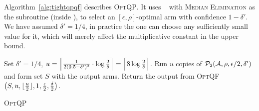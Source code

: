 Algorithm~\ref{alg:tightqpqf} describes \textsc{OptQP}. It uses \PP~\cite{bib:arcsk2017} with  \textsc{ Median Elimination}  as the 
subroutine (inside \PP), to select an  $[\epsilon, \rho]$-optimal arm with confidence $1-\delta'$.
We have assumed $\delta' = 1/4$, in practice the one can choose any
sufficiently small value for it, which will merely affect the multiplicative constant in the upper bound.
\begin{algorithm}[]
\begin{algorithmic}
 \STATE Set $\delta' = 1/4$, $u = \Big\lceil\frac{1}{2(0.5-\delta')^2} \cdot \log\frac{2}{\delta}\Big\rceil = \Big\lceil8 \log\frac{2}{\delta}\Big\rceil$.\;
 \STATE Run $u$ copies of $\mathcal{P}_2(\mathcal{A}, \rho, \epsilon/2, \delta')$ and form set $S$ with the output arms.\;
 \STATE Return the output from \textsc{OptQF} $\left(S, u, \lfloor\frac{u}{2}\rfloor, 1, \frac{\epsilon}{2}, \frac{\delta}{2}\right)$.
\end{algorithmic}
\caption{\textsc{OptQP}}
\label{alg:tightqpqf}
\end{algorithm}


